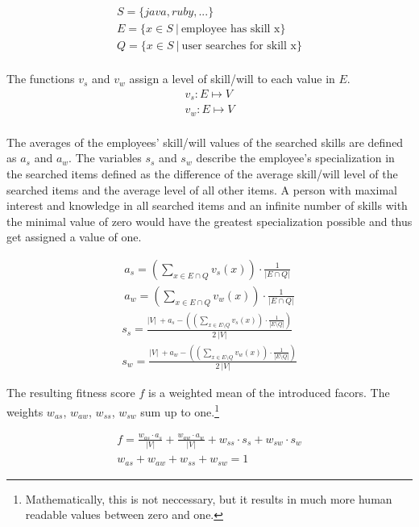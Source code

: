 \begin{gather*}
  S = \{java, ruby, ...\} \\
  E = \{x \in S \ | \ \textrm{employee has skill x}\} \\
  Q = \{x \in S \ | \ \textrm{user searches for skill x}\} \\
\end{gather*}

The functions $v_s$ and $v_w$ assign a level of skill/will to each value in $E$.
\begin{gather*}
  v_s: E \mapsto V \\
  v_w: E \mapsto V \\
\end{gather*}

The averages of the employees' skill/will values of the searched skills are defined as $a_s$ and $a_w$.
The variables $s_s$ and $s_w$ describe the employee's specialization in the searched items defined as the difference
of the average skill/will level of the searched items and the average level of all other items.
A person with maximal interest and knowledge in all searched items and an infinite number of skills with the minimal
value of zero would have the greatest specialization possible and thus get assigned a value of one.

\begin{gather*}
  a_s = \left( \sum_{x \in E \cap Q} v_s(x) \right) \cdot \frac{1}{|E \cap Q|} \\
  a_w = \left( \sum_{x \in E \cap Q} v_w(x) \right) \cdot \frac{1}{|E \cap Q|}
\end{gather*}
\begin{gather*}
  s_s = \frac{|V| \ + a_s - \left( \left( \sum_{x \in E \setminus Q} v_s(x)\right) \cdot \frac{1}{|E \setminus Q|} \right)}{2 \ |V|}\\
  s_w = \frac{|V| \ + a_w - \left( \left( \sum_{x \in E \setminus Q} v_w(x)\right) \cdot \frac{1}{|E \setminus Q|} \right)}{2 \ |V|}
\end{gather*}

The resulting fitness score $f$ is a weighted mean of the introduced facors. The weights $w_{as}$, $w_{aw}$, $w_{ss}$, $w_{sw}$ sum up to one.\footnote{Mathematically, this is not neccessary, but it results in much more human readable values between zero and one.}

\begin{gather*}
  f = \frac{w_{as} \cdot a_s}{|V|} + \frac{w_{aw} \cdot a_w}{|V|} + w_{ss} \cdot s_s + w_{sw} \cdot s_w \\
  w_{as} + w_{aw} + w_{ss} + w_{sw} = 1
\end{gather*}

